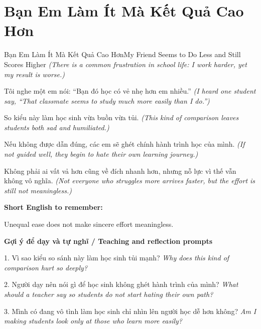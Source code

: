 \section{Bạn Em Làm Ít Mà Kết Quả Cao Hơn}
\begin{truyen}{Bạn Em Làm Ít Mà Kết Quả Cao Hơn}{My Friend Seems to Do Less and Still Scores Higher}
\textit{(There is a common frustration in school life: I work harder, yet my result is worse.)}

Tôi nghe một em nói: “Bạn đó học có vẻ nhẹ hơn em nhiều.”
\textit{(I heard one student say, “That classmate seems to study much more easily than I do.”)}

So kiểu này làm học sinh vừa buồn vừa tủi.
\textit{(This kind of comparison leaves students both sad and humiliated.)}

Nếu không được dẫn đúng, các em sẽ ghét chính hành trình học của mình.
\textit{(If not guided well, they begin to hate their own learning journey.)}

\end{truyen}

\begin{baihoc}
Không phải ai vất vả hơn cũng về đích nhanh hơn, nhưng nỗ lực vì thế vẫn không vô nghĩa.
\textit{(Not everyone who struggles more arrives faster, but the effort is still not meaningless.)}
\end{baihoc}

\begin{ghinhoanh}
\textbf{Short English to remember:}

Unequal ease does not make sincere effort meaningless.

\end{ghinhoanh}

\begin{tuhocnhanh}
\textbf{Gợi ý để dạy và tự nghĩ / Teaching and reflection prompts}

1. Vì sao kiểu so sánh này làm học sinh tủi mạnh? \textit{Why does this kind of comparison hurt so deeply?}

2. Người dạy nên nói gì để học sinh không ghét hành trình của mình? \textit{What should a teacher say so students do not start hating their own path?}

3. Mình có đang vô tình làm học sinh chỉ nhìn lên người học dễ hơn không? \textit{Am I making students look only at those who learn more easily?}
\end{tuhocnhanh}
\ngancach

